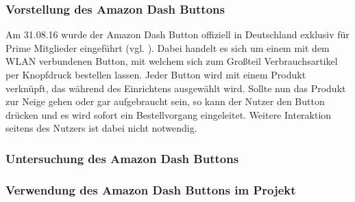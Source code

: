 \subsubsection{Vorstellung des Amazon Dash Buttons}        
\label{sec:Vorstellung des Amazon Dash Buttons} 
Am 31.08.16 wurde der Amazon Dash Button offiziell in Deutschland exklusiv für Prime Mitglieder eingeführt (vgl. \cite{ONLINE.31.08.2016}).
Dabei handelt es sich um einem mit dem WLAN verbundenen Button, mit welchem sich zum Großteil Verbrauchsartikel per Knopfdruck bestellen lassen. Jeder Button wird mit einem Produkt verknüpft, das während des Einrichtens ausgewählt wird. Sollte nun das Produkt zur Neige gehen oder gar aufgebraucht sein, so kann der Nutzer den Button drücken und es wird sofort ein Bestellvorgang eingeleitet. Weitere Interaktion seitens des Nutzers ist dabei nicht notwendig.


\subsubsection{Untersuchung des Amazon Dash Buttons}
\label{sec:Untersuchung des Amazon Dash Buttons}

\subsubsection{Verwendung des Amazon Dash Buttons im Projekt}
\label{sec:Verwendung des Amazon Dash Buttons im Projekt}
